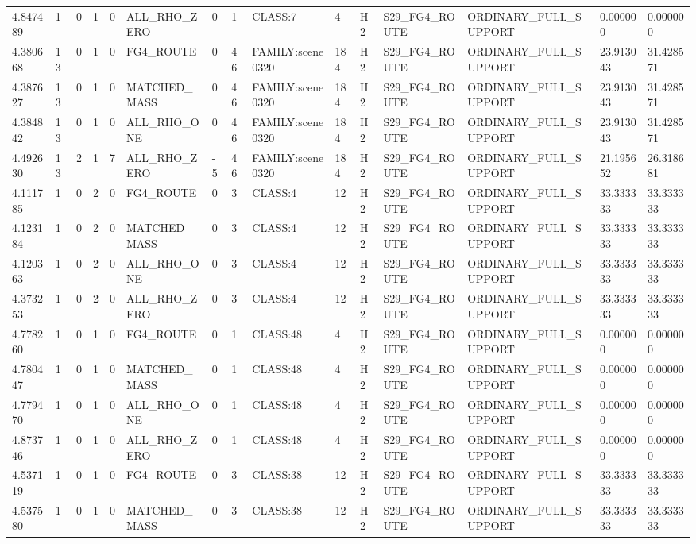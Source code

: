 \begin{tabular}{lllllllllllllll}
4.847489 & 1 & 0 & 1 & 0 & ALL\_RHO\_ZERO & 0 & 1 & CLASS:7 & 4 & H2 & S29\_FG4\_ROUTE & ORDINARY\_FULL\_SUPPORT & 0.000000 & 0.000000 \\
4.380668 & 13 & 0 & 1 & 0 & FG4\_ROUTE & 0 & 46 & FAMILY:scene0320 & 184 & H2 & S29\_FG4\_ROUTE & ORDINARY\_FULL\_SUPPORT & 23.913043 & 31.428571 \\
4.387627 & 13 & 0 & 1 & 0 & MATCHED\_MASS & 0 & 46 & FAMILY:scene0320 & 184 & H2 & S29\_FG4\_ROUTE & ORDINARY\_FULL\_SUPPORT & 23.913043 & 31.428571 \\
4.384842 & 13 & 0 & 1 & 0 & ALL\_RHO\_ONE & 0 & 46 & FAMILY:scene0320 & 184 & H2 & S29\_FG4\_ROUTE & ORDINARY\_FULL\_SUPPORT & 23.913043 & 31.428571 \\
4.492630 & 13 & 2 & 1 & 7 & ALL\_RHO\_ZERO & -5 & 46 & FAMILY:scene0320 & 184 & H2 & S29\_FG4\_ROUTE & ORDINARY\_FULL\_SUPPORT & 21.195652 & 26.318681 \\
4.111785 & 1 & 0 & 2 & 0 & FG4\_ROUTE & 0 & 3 & CLASS:4 & 12 & H2 & S29\_FG4\_ROUTE & ORDINARY\_FULL\_SUPPORT & 33.333333 & 33.333333 \\
4.123184 & 1 & 0 & 2 & 0 & MATCHED\_MASS & 0 & 3 & CLASS:4 & 12 & H2 & S29\_FG4\_ROUTE & ORDINARY\_FULL\_SUPPORT & 33.333333 & 33.333333 \\
4.120363 & 1 & 0 & 2 & 0 & ALL\_RHO\_ONE & 0 & 3 & CLASS:4 & 12 & H2 & S29\_FG4\_ROUTE & ORDINARY\_FULL\_SUPPORT & 33.333333 & 33.333333 \\
4.373253 & 1 & 0 & 2 & 0 & ALL\_RHO\_ZERO & 0 & 3 & CLASS:4 & 12 & H2 & S29\_FG4\_ROUTE & ORDINARY\_FULL\_SUPPORT & 33.333333 & 33.333333 \\
4.778260 & 1 & 0 & 1 & 0 & FG4\_ROUTE & 0 & 1 & CLASS:48 & 4 & H2 & S29\_FG4\_ROUTE & ORDINARY\_FULL\_SUPPORT & 0.000000 & 0.000000 \\
4.780447 & 1 & 0 & 1 & 0 & MATCHED\_MASS & 0 & 1 & CLASS:48 & 4 & H2 & S29\_FG4\_ROUTE & ORDINARY\_FULL\_SUPPORT & 0.000000 & 0.000000 \\
4.779470 & 1 & 0 & 1 & 0 & ALL\_RHO\_ONE & 0 & 1 & CLASS:48 & 4 & H2 & S29\_FG4\_ROUTE & ORDINARY\_FULL\_SUPPORT & 0.000000 & 0.000000 \\
4.873746 & 1 & 0 & 1 & 0 & ALL\_RHO\_ZERO & 0 & 1 & CLASS:48 & 4 & H2 & S29\_FG4\_ROUTE & ORDINARY\_FULL\_SUPPORT & 0.000000 & 0.000000 \\
4.537119 & 1 & 0 & 1 & 0 & FG4\_ROUTE & 0 & 3 & CLASS:38 & 12 & H2 & S29\_FG4\_ROUTE & ORDINARY\_FULL\_SUPPORT & 33.333333 & 33.333333 \\
4.537580 & 1 & 0 & 1 & 0 & MATCHED\_MASS & 0 & 3 & CLASS:38 & 12 & H2 & S29\_FG4\_ROUTE & ORDINARY\_FULL\_SUPPORT & 33.333333 & 33.333333 \\

\end{tabular}

